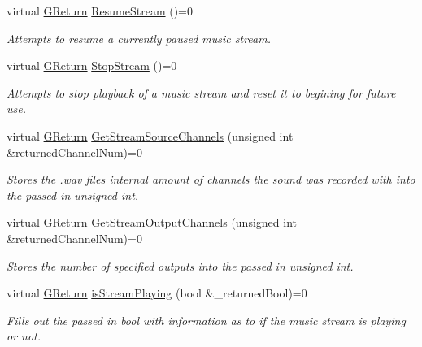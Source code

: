 \begin{DoxyCompactItemize}
virtual \mbox{\hyperlink{namespaceGW_a67a839e3df7ea8a5c5686613a7a3de21}{G\+Return}} \mbox{\hyperlink{classGW_1_1AUDIO_1_1GMusic_a56cc4db5fab860fdb948630b821bcdbd}{Resume\+Stream}} ()=0
\begin{DoxyCompactList}\small\item\em Attempts to resume a currently paused music stream. \end{DoxyCompactList}\item 
virtual \mbox{\hyperlink{namespaceGW_a67a839e3df7ea8a5c5686613a7a3de21}{G\+Return}} \mbox{\hyperlink{classGW_1_1AUDIO_1_1GMusic_a7d0ecd391a9723426dd3a24df7db1ad8}{Stop\+Stream}} ()=0
\begin{DoxyCompactList}\small\item\em Attempts to stop playback of a music stream and reset it to begining for future use. \end{DoxyCompactList}\item 
virtual \mbox{\hyperlink{namespaceGW_a67a839e3df7ea8a5c5686613a7a3de21}{G\+Return}} \mbox{\hyperlink{classGW_1_1AUDIO_1_1GMusic_aef10f15b8487e18c2d65d1666ba64662}{Get\+Stream\+Source\+Channels}} (unsigned int \&returned\+Channel\+Num)=0
\begin{DoxyCompactList}\small\item\em Stores the .wav files internal amount of channels the sound was recorded with into the passed in unsigned int. \end{DoxyCompactList}\item 
virtual \mbox{\hyperlink{namespaceGW_a67a839e3df7ea8a5c5686613a7a3de21}{G\+Return}} \mbox{\hyperlink{classGW_1_1AUDIO_1_1GMusic_a750dcb654e813c322d7617e1a5ebdf93}{Get\+Stream\+Output\+Channels}} (unsigned int \&returned\+Channel\+Num)=0
\begin{DoxyCompactList}\small\item\em Stores the number of specified outputs into the passed in unsigned int. \end{DoxyCompactList}\item 
virtual \mbox{\hyperlink{namespaceGW_a67a839e3df7ea8a5c5686613a7a3de21}{G\+Return}} \mbox{\hyperlink{classGW_1_1AUDIO_1_1GMusic_a0a0f4d5e0d11f7aec7ed9a1a6371df1a}{is\+Stream\+Playing}} (bool \&\+\_\+returned\+Bool)=0
\begin{DoxyCompactList}\small\item\em Fills out the passed in bool with information as to if the music stream is playing or not. \end{DoxyCompactList}\item 

\end{DoxyCompactItemize}
